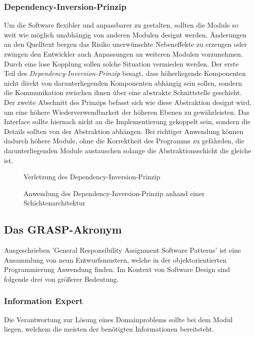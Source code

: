 \documentclass[conference]{IEEEtran}
\begin{document}
\subsubsection{Dependency-Inversion-Prinzip} Um die Software flexibler und anpassbarer zu gestalten, sollten die Module   so weit wie möglich unabhängig von anderen Modulen designt werden. Änderungen an den Quelltext bergen das Risiko unerwünschte Nebeneffekte zu erzeugen oder zwingen den Entwickler auch Anpassungen an weiteren Modulen vorzunehmen. Durch eine lose Kopplung sollen solche Situation vermieden werden. Der erste Teil des \emph{Dependency-Inversion-Prinzip} besagt, dass höherliegende Komponenten nicht direkt von darunterliegenden Komponenten abhängig sein sollen, sondern die Kommunikation zwischen ihnen über eine abstrakte Schnittstelle geschieht. Der zweite Abschnitt des Prinzips befasst sich wie diese Abstraktion designt wird, um eine höhere Wiederverwendbarkeit der höheren Ebenen zu gewährleisten. Das Interface sollte hiernach nicht an die Implementierung gekoppelt sein, sondern die Details sollten von der Abstraktion abhängen. Bei richtiger Anwendung können dadurch höhere Module, ohne die Korrektheit des Programms zu gefährden, die darunterliegenden Module austauschen solange die Abstraktionsschicht die gleiche ist.

\begin{figure}[htbp]
	\small
	
	\caption{Verletzung des Dependency-Inversion-Prinzip}
	\label{VorDIP}
\end{figure}


\begin{figure}[htbp]
	\small
	
	\caption{Anwendung des Dependency-Inversion-Prinzip anhand einer Schichtenarchitektur}
	\label{NachDIP}
\end{figure}

\subsection{Das GRASP-Akronym} Ausgeschrieben 'General Responsibility Assignment Software Patterns' ist eine Ansammlung von neun Entwurfsmustern, welche in der objektorientierten Programmierung Anwendung finden. Im Kontext von Software Design sind folgende drei von größerer Bedeutung.

\subsubsection{Information Expert} Die Verantwortung zur Lösung eines Domainproblems sollte bei dem Modul liegen, welchem die meisten der benötigten Informationen bereitsteht.
\end{document}

